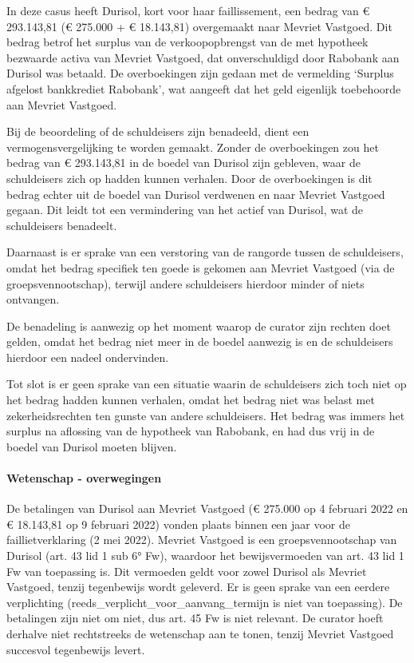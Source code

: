 \documentclass[
  dutch,
  a4paper,
]{article}
\begin{document}
In deze casus heeft Durisol, kort voor haar faillissement, een bedrag van € 293.143,81 (€ 275.000 + € 18.143,81) overgemaakt naar Mevriet Vastgoed. Dit bedrag betrof het surplus van de verkoopopbrengst van de met hypotheek bezwaarde activa van Mevriet Vastgoed, dat onverschuldigd door Rabobank aan Durisol was betaald. De overboekingen zijn gedaan met de vermelding `Surplus afgelost bankkrediet Rabobank', wat aangeeft dat het geld eigenlijk toebehoorde aan Mevriet Vastgoed.

Bij de beoordeling of de schuldeisers zijn benadeeld, dient een vermogensvergelijking te worden gemaakt. Zonder de overboekingen zou het bedrag van € 293.143,81 in de boedel van Durisol zijn gebleven, waar de schuldeisers zich op hadden kunnen verhalen. Door de overboekingen is dit bedrag echter uit de boedel van Durisol verdwenen en naar Mevriet Vastgoed gegaan. Dit leidt tot een vermindering van het actief van Durisol, wat de schuldeisers benadeelt.

Daarnaast is er sprake van een verstoring van de rangorde tussen de schuldeisers, omdat het bedrag specifiek ten goede is gekomen aan Mevriet Vastgoed (via de groepsvennootschap), terwijl andere schuldeisers hierdoor minder of niets ontvangen.

De benadeling is aanwezig op het moment waarop de curator zijn rechten doet gelden, omdat het bedrag niet meer in de boedel aanwezig is en de schuldeisers hierdoor een nadeel ondervinden.

Tot slot is er geen sprake van een situatie waarin de schuldeisers zich toch niet op het bedrag hadden kunnen verhalen, omdat het bedrag niet was belast met zekerheidsrechten ten gunste van andere schuldeisers. Het bedrag was immers het surplus na aflossing van de hypotheek van Rabobank, en had dus vrij in de boedel van Durisol moeten blijven.

\paragraph{Wetenschap - overwegingen}\label{wetenschap---overwegingen-9}

De betalingen van Durisol aan Mevriet Vastgoed (€ 275.000 op 4 februari 2022 en € 18.143,81 op 9 februari 2022) vonden plaats binnen een jaar voor de faillietverklaring (2 mei 2022). Mevriet Vastgoed is een groepsvennootschap van Durisol (art. 43 lid 1 sub 6° Fw), waardoor het bewijsvermoeden van art. 43 lid 1 Fw van toepassing is. Dit vermoeden geldt voor zowel Durisol als Mevriet Vastgoed, tenzij tegenbewijs wordt geleverd. Er is geen sprake van een eerdere verplichting (reeds\_verplicht\_voor\_aanvang\_termijn is niet van toepassing). De betalingen zijn niet om niet, dus art. 45 Fw is niet relevant. De curator hoeft derhalve niet rechtstreeks de wetenschap aan te tonen, tenzij Mevriet Vastgoed succesvol tegenbewijs levert.
\end{document}
